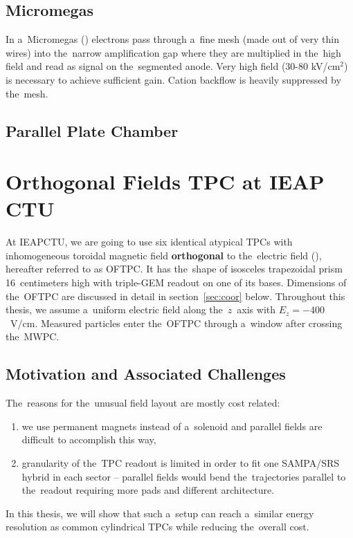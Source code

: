		\subsection{Micromegas}
			In a~\ac{Micromegas} () electrons pass through a~fine mesh (made out of very thin wires) into the~narrow amplification gap where they are multiplied in the~high field and read as signal on the~segmented anode. Very high field (30-80 kV/cm$^2$) is necessary to achieve sufficient gain. Cation backflow is heavily suppressed by the~mesh.
			
		\subsection{Parallel Plate Chamber}
			
			
	
	\section{Orthogonal Fields TPC at IEAP CTU}
	\label{sec:oftpc}
		At \ac{IEAPCTU}, we are going to use six identical atypical \ac{TPC}s with inhomogeneous toroidal magnetic field \textbf{orthogonal} to the~electric field (), hereafter referred to as \acf{OFTPC}. It has the~shape of isosceles trapezoidal prism 16~centimeters high with triple\nobreakdash-\ac{GEM} readout on one of its bases. Dimensions of the~\ac{OFTPC} are discussed in detail in section~\ref{sec:coor} below. Throughout this thesis, we assume a~uniform electric field along the~$z$~axis with $E_z = -400$~V/cm.  Measured particles enter the~\ac{OFTPC} through a~window after crossing the~\ac{MWPC}. 
		
		
		\subsection{Motivation and Associated Challenges}
			The~reasons for the~unusual field layout are mostly cost related:
				\begin{enumerate}[nosep,label=\alph*)]
					\item we use permanent magnets instead of a~solenoid and parallel fields are difficult to accomplish this way,
					\item granularity of the~\ac{TPC} readout is limited in order to fit one SAMPA/SRS hybrid in each sector -- parallel fields would bend the~trajectories parallel to the~readout requiring more pads and different architecture.
				\end{enumerate}
			In this thesis, we will show that such a~setup can reach a~similar energy resolution as common cylindrical \ac{TPC}s while reducing the~overall cost.
			
